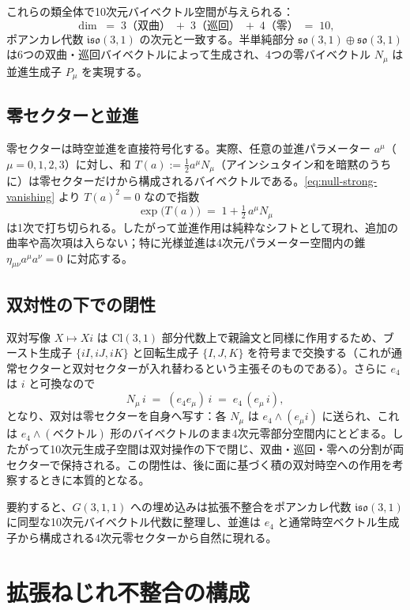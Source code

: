 \documentclass[11pt,a4paper]{article}
\begin{document}
これらの類全体で10次元バイベクトル空間が与えられる：
\[
\dim \;=\; 3 \text{（双曲）} \;+\; 3 \text{（巡回）} \;+\; 4 \text{（零）} \;=\; 10,
\]
ポアンカレ代数 $\mathfrak{iso}(3,1)$ の次元と一致する。半単純部分 $\mathfrak{so}(3,1)\oplus\mathfrak{so}(3,1)$ は6つの双曲・巡回バイベクトルによって生成され、4つの零バイベクトル $N_{\mu}$ は並進生成子 $P_{\mu}$ を実現する。

\subsection{零セクターと並進}

零セクターは時空並進を直接符号化する。実際、任意の並進パラメーター $a^{\mu}$（$\mu=0,1,2,3$）に対し、和 $T(a):=\tfrac{1}{2}a^{\mu}N_{\mu}$（アインシュタイン和を暗黙のうちに）は零セクターだけから構成されるバイベクトルである。\eqref{eq:null-strong-vanishing} より $T(a)^{2}=0$ なので指数
\[
\exp\bigl(T(a)\bigr) \;=\; 1 + \tfrac{1}{2}\,a^{\mu}N_{\mu}
\]
は1次で打ち切られる。したがって並進作用は純粋なシフトとして現れ、追加の曲率や高次項は入らない；特に光様並進は4次元パラメーター空間内の錐 $\eta_{\mu\nu}a^{\mu}a^{\nu}=0$ に対応する。

\subsection{双対性の下での閉性}

双対写像 $X\mapsto Xi$ は $\mathrm{Cl}(3,1)$ 部分代数上で親論文と同様に作用するため、ブースト生成子 $\{iI,iJ,iK\}$ と回転生成子 $\{I,J,K\}$ を符号まで交換する（これが通常セクターと双対セクターが入れ替わるという主張そのものである）。さらに $e_{4}$ は $i$ と可換なので
\[
N_{\mu}\,i \;=\; (e_{4}e_{\mu})\,i \;=\; e_{4}\,(e_{\mu}\,i),
\]
となり、双対は零セクターを自身へ写す：各 $N_{\mu}$ は $e_{4}\wedge(e_{\mu}i)$ に送られ、これは $e_{4}\wedge(\text{ベクトル})$ 形のバイベクトルのまま4次元零部分空間内にとどまる。したがって10次元生成子空間は双対操作の下で閉じ、双曲・巡回・零への分割が両セクターで保持される。この閉性は、後に面に基づく積の双対時空への作用を考察するときに本質的となる。

要約すると、$G(3,1,1)$ への埋め込みは拡張不整合をポアンカレ代数 $\mathfrak{iso}(3,1)$ に同型な10次元バイベクトル代数に整理し、並進は $e_{4}$ と通常時空ベクトル生成子から構成される4次元零セクターから自然に現れる。

\section{拡張ねじれ不整合の構成}
\end{document}
